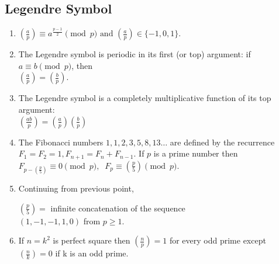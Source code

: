  \subsection{Legendre Symbol}
  \begin{enumerate}[resume]
    \item $\displaystyle \left(\frac{a}{p}\right)\equiv a^{\frac{p-1}{2}} \pmod{p} \text{ and } \left(\frac{a}{p}\right)\in\{-1,0,1\}.$
    \item The Legendre symbol is periodic in its first (or top) argument: if $\displaystyle a \equiv b \pmod{p}$, then \\
    $\displaystyle \left(\frac{a}{p}\right)=\left(\frac{b}{p}\right).$
    \item The Legendre symbol is a completely multiplicative function of its top argument: \\
    $\displaystyle \left(\frac{ab}{p} \right) = \left(\frac{a}{p} \right) \left(\frac{b}{p} \right)$
    \item The Fibonacci numbers $\displaystyle 1,1,2,3,5,8,13\dots$ are defined by the recurrence $\displaystyle F_1 = F_2 = 1,F_{n+1} = F_n + F_{n-1}.$ If $\displaystyle p$ is a prime number then \\
    $\displaystyle F_{p-\left(\frac{p}{5}\right)} \equiv 0 {\pmod{p}}, \;\;F_p \equiv \left(\frac{p}{5}\right) {\pmod{p}}.$
  \item Continuing from previous point, \\
      {\raggedright $\displaystyle \left(\frac{p}{5}\right) = $ infinite concatenation of the sequence \\
      $(1,-1,-1,1,0)$ from $p \geq 1$. \par}
    \item If $n = k^2$ is perfect square then $\displaystyle \left(\frac{n}{p}\right)=1$ for every odd prime except $\displaystyle \left(\frac{n}{k}\right)=0$ if k is an odd prime.
    \end{enumerate}
